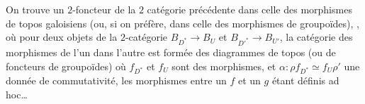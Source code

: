 On trouve un $2$-foncteur de la
$2$ catégorie précédente dans celle des morphismes de topos galoisiens (ou, si on préfère, dans celle des morphismes de groupoïdes), 
,
où pour deux objets de la $2$-catégorie $B_{D^*}\to B_U$ et $B_{D'^*}\to B_{U'}$, la catégorie des morphismes de l'un dans l'autre est formée des diagrammes    de topos (ou de foncteurs de groupoïdes)
où $f_{D^*}$ et $f_U$ sont des morphismes, et \deleted{\unsure{$\alpha$}} $\alpha\colon\rho f_{D^*}\simeq f_U\rho'$ une donnée de commutativité,  les morphismes entre un $f$ et un $g$ étant définis ad hoc\ldots

